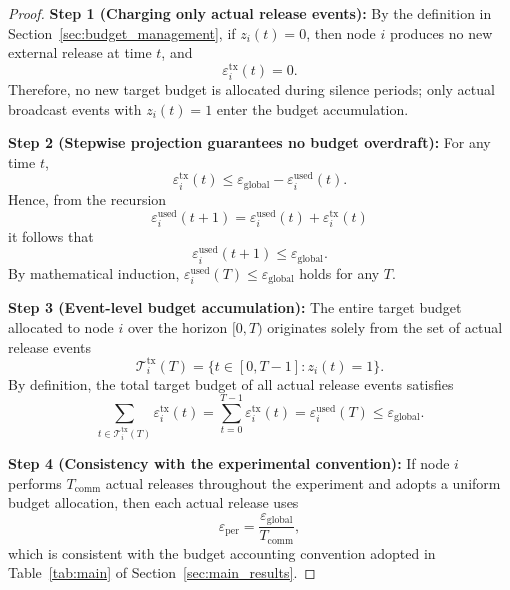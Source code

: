 \documentclass[10pt]{article}
\newcommand{\egl}{\varepsilon_{\text{global}}}
\begin{document}
\begin{proof}[Proof]
\textbf{Step 1 (Charging only actual release events):} By the definition in Section~\ref{sec:budget_management}, if $z_i(t)=0$, then node $i$ produces no new external release at time $t$, and
\[
  \varepsilon_i^{\mathrm{tx}}(t)=0.
\]
Therefore, no new target budget is allocated during silence periods; only actual broadcast events with $z_i(t)=1$ enter the budget accumulation.

\textbf{Step 2 (Stepwise projection guarantees no budget overdraft):} For any time $t$,
\[
  \varepsilon_i^{\mathrm{tx}}(t)\leq \egl-\varepsilon_i^{\mathrm{used}}(t).
\]
Hence, from the recursion
\[
  \varepsilon_i^{\mathrm{used}}(t+1)=\varepsilon_i^{\mathrm{used}}(t)+\varepsilon_i^{\mathrm{tx}}(t)
\]
it follows that
\[
  \varepsilon_i^{\mathrm{used}}(t+1)\leq \egl.
\]
By mathematical induction, $\varepsilon_i^{\mathrm{used}}(T)\leq\egl$ holds for any $T$.

\textbf{Step 3 (Event-level budget accumulation):} The entire target budget allocated to node $i$ over the horizon $[0,T)$ originates solely from the set of actual release events
\[
  \mathcal{T}_i^{\mathrm{tx}}(T)=\{t\in[0,T-1]: z_i(t)=1\}.
\]
By definition, the total target budget of all actual release events satisfies
\[
  \sum_{t\in\mathcal{T}_i^{\mathrm{tx}}(T)}\varepsilon_i^{\mathrm{tx}}(t)
  =\sum_{t=0}^{T-1}\varepsilon_i^{\mathrm{tx}}(t)
  =\varepsilon_i^{\mathrm{used}}(T)
  \leq \egl.
\]

\textbf{Step 4 (Consistency with the experimental convention):} If node $i$ performs $T_{\mathrm{comm}}$ actual releases throughout the experiment and adopts a uniform budget allocation, then each actual release uses
\[
  \varepsilon_{\mathrm{per}}=\frac{\egl}{T_{\mathrm{comm}}},
\]
which is consistent with the budget accounting convention adopted in Table~\ref{tab:main} of Section~\ref{sec:main_results}.
\end{proof}
\end{document}

